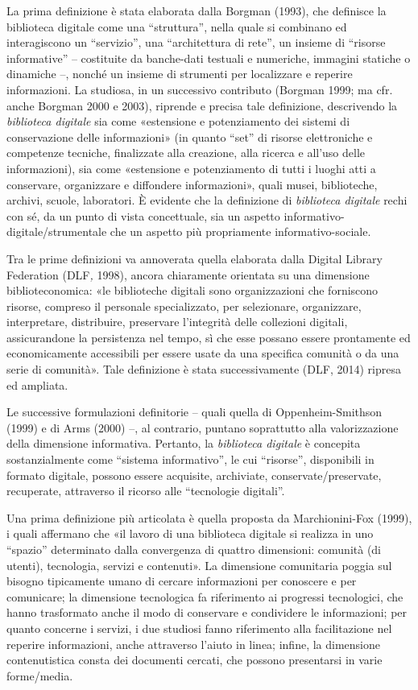 \documentclass[
  b5paper,
  twoside,
  11pt,
  chapterprefix=false,
  bibliography=totocnumbered,
  parskip=0]{scrbook}
\begin{document}
La prima definizione è stata elaborata dalla Borgman (1993), che
definisce la biblioteca digitale come una \enquote{struttura}, nella quale si
combinano ed interagiscono un \enquote{servizio}, una \enquote{architettura di rete}, un
insieme di \enquote{risorse informative} -- costituite da banche-dati testuali e
numeriche, immagini statiche o dinamiche --, nonché un insieme di
strumenti per localizzare e reperire informazioni. La studiosa, in un
successivo contributo (Borgman 1999; ma cfr. anche Borgman 2000 e 2003),
riprende e precisa tale definizione, descrivendo la \emph{biblioteca
digitale} sia come «estensione e potenziamento dei sistemi di
conservazione delle informazioni» (in quanto \enquote{set} di risorse
elettroniche e competenze tecniche, finalizzate alla creazione, alla
ricerca e all'uso delle informazioni), sia come «estensione e
potenziamento di tutti i luoghi atti a conservare, organizzare e
diffondere informazioni», quali musei, biblioteche, archivi, scuole,
laboratori. È evidente che la definizione di \emph{biblioteca digitale} rechi
con sé, da un punto di vista concettuale, sia un aspetto
informativo-digitale/strumentale che un aspetto più propriamente
informativo-sociale.

Tra le prime definizioni va annoverata quella elaborata dalla Digital
Library Federation (DLF\emph{,} 1998), ancora chiaramente orientata su una
dimensione biblioteconomica: «le biblioteche digitali sono
organizzazioni che forniscono risorse, compreso il personale
specializzato, per selezionare, organizzare, interpretare, distribuire,
preservare l'integrità delle collezioni digitali, assicurandone la
persistenza nel tempo, sì che esse possano essere prontamente ed
economicamente accessibili per essere usate da una specifica comunità o
da una serie di comunità». Tale definizione è stata successivamente
(DLF, 2014) ripresa ed ampliata.

Le successive formulazioni definitorie -- quali quella di
Oppenheim-Smithson (1999) e di Arms (2000) --, al contrario, puntano
soprattutto alla valorizzazione della dimensione informativa. Pertanto,
la \emph{biblioteca digitale} è concepita sostanzialmente come \enquote{sistema
informativo}, le cui \enquote{risorse}, disponibili in formato digitale, possono
essere acquisite, archiviate, conservate/preservate, recuperate,
attraverso il ricorso alle \enquote{tecnologie digitali}.

Una prima definizione più articolata è quella proposta da
Marchionini-Fox (1999), i quali affermano che «il lavoro di una
biblioteca digitale si realizza in uno \enquote{spazio} determinato dalla
convergenza di quattro dimensioni: comunità (di utenti), tecnologia,
servizi e contenuti». La dimensione comunitaria poggia sul bisogno
tipicamente umano di cercare informazioni per conoscere e per
comunicare; la dimensione tecnologica fa riferimento ai progressi
tecnologici, che hanno trasformato anche il modo di conservare e
condividere le informazioni; per quanto concerne i servizi, i due
studiosi fanno riferimento alla facilitazione nel reperire informazioni,
anche attraverso l'aiuto in linea; infine, la dimensione contenutistica
consta dei documenti cercati, che possono presentarsi in varie
forme/media.
\end{document}
